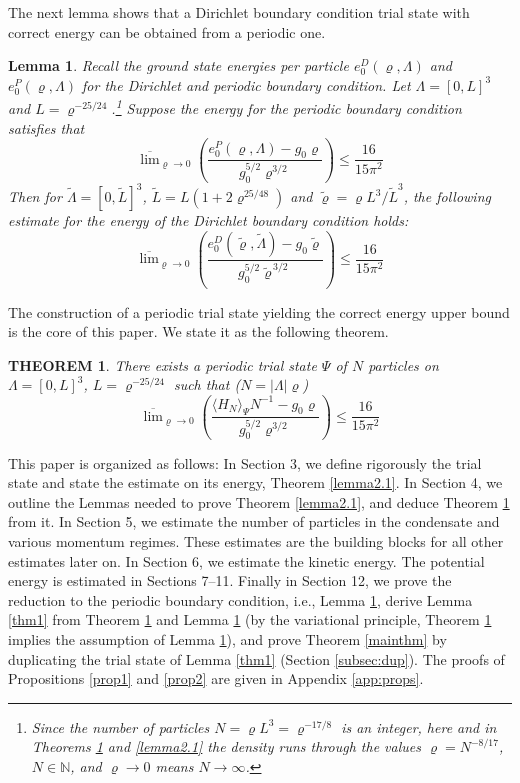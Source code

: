 \documentclass[11pt]{article}
\numberwithin{equation}{section}
\newcommand{\beq}{\begin{equation}}
\newcommand{\eeq}{\end{equation}}
\newcommand\N{{\mathbb N}}
\renewcommand\rho\varrho
\newtheorem{thm}{THEOREM}[section]
\newtheorem{lem}{Lemma}[section]
\theoremstyle{definition}
\begin{document}
The next lemma shows that a Dirichlet boundary condition trial state with correct energy can be obtained from a   
periodic one.

\begin{lem}\label{lemma1}
Recall the ground state energies  per particle  $e^{D}_0(\rho,\Lambda)$ and $e^{P}_0(\rho,\Lambda)$ for 
the Dirichlet and periodic boundary condition. 
Let   $\Lambda = [0, L]^3$ and  $L = \rho^{-25/24}$.\footnote{Since the number of particles $N=\rho L^3=\rho^{-17/8}$
is an integer, here and in Theorems \ref{lemma2} and \ref{lemma2.1} the density runs through the values
$\rho=N^{-8/17}$, $N\in\N$, and $\rho\to0$ means $N\to\infty$.} Suppose  the energy for the periodic boundary condition
satisfies that 
\beq
\overline\lim_{\rho\to0}\left(
\frac{e^P_0(\rho,\Lambda)-g_0\rho }{ g_0^{5/2} \rho ^{3/2}}\right)\leq \frac{16}{15\pi^2}
\eeq
Then for $\widetilde\Lambda=[0, \widetilde L ]^3$, $\widetilde L=L(1+2\rho^{25/48})$ and $\widetilde \rho=\rho L^3/\widetilde L^3$, the following estimate for the energy of the Dirichlet boundary condition  holds: 
\beq\label{resultlemma1}
\overline\lim_{\rho\to0}\left(
\frac{e^D_0(\widetilde \rho,\widetilde\Lambda)-g_0\widetilde \rho }{ g_0^{5/2} \widetilde \rho ^{\,3/2}}\right)\leq \frac{16}{15\pi^2}
\eeq
\end{lem}


The construction of  a periodic trial state yielding the correct energy upper bound is the core of this paper. 
We state it as the following theorem. 
 
\begin{thm}\label{lemma2}
There exists a periodic trial state $\Psi$ of $N$ particles on $\Lambda = [ 0, L]^3$,  $L = \rho^{-25/24}$ such that ($N=|\Lambda|\rho$) 
\beq
\overline\lim_{\rho\to0}\left(
\frac{\langle H_N\rangle_\Psi N^{-1}-g_0\rho }{ g_0^{5/2}\rho^{3/2}}\right)\leq \frac{16}{15\pi^2}
\eeq
\end{thm}


This paper is organized as follows: In Section 3, we define rigorously the trial state and state the estimate
on its energy, Theorem \ref{lemma2.1}.
In Section 4, we outline the Lemmas needed to prove Theorem \ref{lemma2.1}, and deduce Theorem \ref{lemma2} from it.
In Section 5, we estimate the number of particles in the condensate and various momentum regimes.
These estimates are the building blocks for all other estimates later on. In Section 6, we estimate the kinetic energy. The potential energy is estimated in Sections 7--11. Finally in Section 12, we prove the reduction
to the periodic boundary condition, i.e., Lemma \ref{lemma1}, derive Lemma \ref{thm1} from Theorem \ref{lemma2} and
Lemma \ref{lemma1} (by the variational principle, Theorem \ref{lemma2} implies the assumption of Lemma \ref{lemma1}),
and prove Theorem \ref{mainthm} by duplicating the trial state of Lemma \ref{thm1} (Section \ref{subsec:dup}).
The proofs of Propositions \ref{prop1} and \ref{prop2} are given in Appendix \ref{app:props}.
\end{document}
